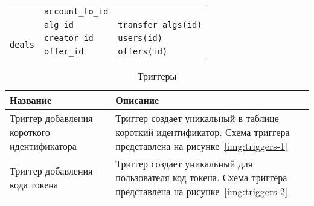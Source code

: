 \begin{table}[!th]
\begin{tabular}{|p{5cm}|p{5.5cm}|p{5cm}|}
         \cline{2-2}
         & \texttt{account\_to\_id} & \\
         \cline{2-3}
         & \texttt{alg\_id} & \texttt{transfer\_algs(id)} \\
         \hline
         \multirow{2}{3cm}{\texttt{deals}} & \texttt{creator\_id} & \texttt{users(id)} \\
         \cline{2-3}
         & \texttt{offer\_id} & \texttt{offers(id)} \\
         \hline
    \end{tabular}
\end{table}



\begin{table}[!th]
    \centering
    \caption{Триггеры}
    \label{tab:db-triggers}
    \begin{tabular}{|p{5cm}|p{11cm}|}
         \hline
         \textbf{Название} & \textbf{Описание} \\
         \hline
         Триггер добавления короткого идентификатора & Триггер создает уникальный в таблице короткий идентификатор. Схема триггера представлена на рисунке~\ref{img:triggers-1} \\
         \hline
         Триггер добавления кода токена & Триггер создает уникальный для пользователя код токена. Схема триггера представлена на рисунке~\ref{img:triggers-2} \\
         \hline
    \end{tabular}
\end{table}

